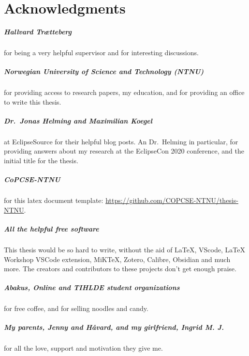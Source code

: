 \cleardoublepage{} %
\chapter*{Acknowledgments}

\paragraph*{Hallvard Trætteberg} for being a very helpful supervisor
and for interesting discussions.

\paragraph*{Norwegian University of Science and Technology (NTNU)} for providing access to research papers, my education, and for providing an office to write this thesis. 

\paragraph*{Dr.\ Jonas Helming and Maximilian Koegel} at EclipseSource for their helpful blog posts. An Dr.\ Helming in particular, for providing answers about my research at the EclipseCon 2020 conference, and the initial title for the thesis.

\paragraph*{CoPCSE-NTNU} for this latex document template: \href{https://github.com/COPCSE-NTNU/thesis-NTNU}{https://github.com/COPCSE-NTNU/thesis-NTNU}.

\paragraph*{All the helpful free software} This thesis would be so hard to write,
without the aid of \LaTeX, VScode, LaTeX Workshop VSCode extension, MiKTeX, Zotero, Calibre, Obsidian and much more.
The creators and contributors to these projects don't get enough praise.

\paragraph*{Abakus, Online and TIHLDE student organizations} for free coffee, and for selling noodles and candy.

\paragraph*{My parents, Jenny and Håvard, and my girlfriend, Ingrid M. J.} for all the love, support and motivation they give me.



